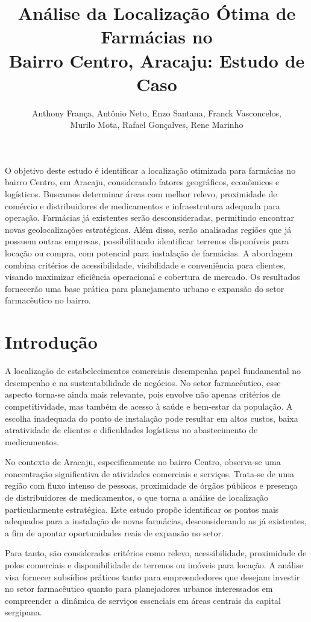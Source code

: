 \documentclass[12pt]{article}
\title{Análise da Localização Ótima de Farmácias no\\ Bairro Centro, Aracaju: Estudo de Caso}
\author{Anthony França, Antônio Neto, Enzo Santana, Franck Vasconcelos,\\
Murilo Mota, Rafael Gonçalves, Rene Marinho}
\begin{document}
 

\maketitle

     
\begin{resumo} 
O objetivo deste estudo é identificar a localização otimizada para farmácias no bairro Centro, em Aracaju, considerando fatores geográficos, econômicos e logísticos. Buscamos determinar áreas com melhor relevo, proximidade de comércio e distribuidores de medicamentos e infraestrutura adequada para operação. Farmácias já existentes serão desconsideradas, permitindo encontrar novas geolocalizações estratégicas. Além disso, serão analisadas regiões que já possuem outras empresas, possibilitando identificar terrenos disponíveis para locação ou compra, com potencial para instalação de farmácias. A abordagem combina critérios de acessibilidade, visibilidade e conveniência para clientes, visando maximizar eficiência operacional e cobertura de mercado. Os resultados fornecerão uma base prática para planejamento urbano e expansão do setor farmacêutico no bairro.
\end{resumo}


\section{Introdução}

A localização de estabelecimentos comerciais desempenha papel fundamental no desempenho e na sustentabilidade de negócios. No setor farmacêutico, esse aspecto torna-se ainda mais relevante, pois envolve não apenas critérios de competitividade, mas também de acesso à saúde e bem-estar da população. A escolha inadequada do ponto de instalação pode resultar em altos custos, baixa atratividade de clientes e dificuldades logísticas no abastecimento de medicamentos.

No contexto de Aracaju, especificamente no bairro Centro, observa-se uma concentração significativa de atividades comerciais e serviços. Trata-se de uma região com fluxo intenso de pessoas, proximidade de órgãos públicos e presença de distribuidores de medicamentos, o que torna a análise de localização particularmente estratégica. Este estudo propõe identificar os pontos mais adequados para a instalação de novas farmácias, desconsiderando as já existentes, a fim de apontar oportunidades reais de expansão no setor.

Para tanto, são considerados critérios como relevo, acessibilidade, proximidade de polos comerciais e disponibilidade de terrenos ou imóveis para locação. A análise visa fornecer subsídios práticos tanto para empreendedores que desejam investir no setor farmacêutico quanto para planejadores urbanos interessados em compreender a dinâmica de serviços essenciais em áreas centrais da capital sergipana.
\end{document}
